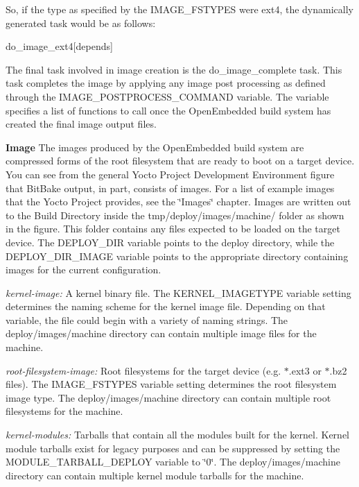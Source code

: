\begin{DoxyItemize}
So, if the type as specified by the I\+M\+A\+G\+E\+\_\+\+F\+S\+T\+Y\+P\+ES were ext4, the dynamically generated task would be as follows\+: \begin{DoxyVerb} do_image_ext4[depends]
\end{DoxyVerb}


The final task involved in image creation is the do\+\_\+image\+\_\+complete task. This task completes the image by applying any image post processing as defined through the I\+M\+A\+G\+E\+\_\+\+P\+O\+S\+T\+P\+R\+O\+C\+E\+S\+S\+\_\+\+C\+O\+M\+M\+A\+ND variable. The variable specifies a list of functions to call once the Open\+Embedded build system has created the final image output files. ~\newline

\item {\bfseries Image} The images produced by the Open\+Embedded build system are compressed forms of the root filesystem that are ready to boot on a target device. You can see from the general Yocto Project Development Environment figure that Bit\+Bake output, in part, consists of images.  For a list of example images that the Yocto Project provides, see the \char`\"{}\+Images\char`\"{} chapter. Images are written out to the Build Directory inside the tmp/deploy/images/machine/ folder as shown in the figure. This folder contains any files expected to be loaded on the target device. The D\+E\+P\+L\+O\+Y\+\_\+\+D\+IR variable points to the deploy directory, while the D\+E\+P\+L\+O\+Y\+\_\+\+D\+I\+R\+\_\+\+I\+M\+A\+GE variable points to the appropriate directory containing images for the current configuration.
\begin{DoxyItemize}
\item {\itshape kernel-\/image\+:} A kernel binary file. The K\+E\+R\+N\+E\+L\+\_\+\+I\+M\+A\+G\+E\+T\+Y\+PE variable setting determines the naming scheme for the kernel image file. Depending on that variable, the file could begin with a variety of naming strings. The deploy/images/machine directory can contain multiple image files for the machine.
\item {\itshape root-\/filesystem-\/image\+:} Root filesystems for the target device (e.\+g. $\ast$.ext3 or $\ast$.bz2 files). The I\+M\+A\+G\+E\+\_\+\+F\+S\+T\+Y\+P\+ES variable setting determines the root filesystem image type. The deploy/images/machine directory can contain multiple root filesystems for the machine.
\item {\itshape kernel-\/modules\+:} Tarballs that contain all the modules built for the kernel. Kernel module tarballs exist for legacy purposes and can be suppressed by setting the M\+O\+D\+U\+L\+E\+\_\+\+T\+A\+R\+B\+A\+L\+L\+\_\+\+D\+E\+P\+L\+OY variable to \char`\"{}0\char`\"{}. The deploy/images/machine directory can contain multiple kernel module tarballs for the machine.

\end{DoxyItemize}
\end{DoxyItemize}
